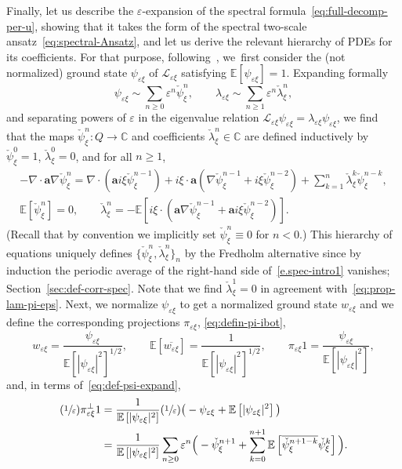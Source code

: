 \documentclass[JEP,XML,SOM,Unicode,published]{cedram}
\newcommand{\Psfrac}[2]{(\sfrac{#1}{#2})}
\theoremstyle{plain}
\theoremstyle{definition}
\numberwithin{equation}{section}
\newcommand{\e}{\varepsilon}
\newcommand{\Lc}{\mathcal{L}}
\newcommand{\C}{\mathbb C}
\newcommand{\Aa}{\boldsymbol a}
\newcommand{\expec}[1]{\mathbb{E}\left[ #1 \right]}
\begin{document}
Finally, let us describe the $\e$-expansion of the spectral formula~\eqref{eq:full-decomp-per-u}, showing that it takes {the} form of the spectral two-scale ansatz~\eqref{eq:spectral-Ansatz}, and let us derive the relevant hierarchy of PDEs for its coefficients. For that purpose, following~\cite{BG}, we~first consider the (not normalized) ground state $\psi_{\e\xi}$ of $\Lc_{\e\xi}$ satisfying $\expec{\psi_{\e\xi}}=1$.
Expanding {formally}
\begin{equation}\label{eq:def-psi-expand}
\psi_{\e\xi} \sim \sum_{n\ge0}\e^{n}\check\psi^n_\xi, \qquad \lambda_{\e\xi}\sim\sum_{n\ge1} \e^{n}\check\lambda^n_\xi,
\end{equation}
and separating powers of $\e$ in the eigenvalue relation $\Lc_{\e\xi}\psi_{\e\xi}=\lambda_{\e\xi}\psi_{\e\xi}$, we find that the maps $\check \psi^n_\xi:Q \to \C$ and coefficients $\check\lambda^n_\xi \in \C$ are defined inductively by $\check\psi^0_\xi=1$, $\check\lambda^0_\xi=0$, and for all $n\ge1$,
\begin{gather}\label{e.spec-intro1}
-\nabla\cdot\Aa\nabla\check\psi^{n}_\xi=\nabla\cdot(\Aa i\xi \check\psi^{n-1}_\xi)+i\xi\cdot \Aa(\nabla\check\psi^{n-1}_\xi+ i\xi\check\psi^{n-2}_\xi)+\sum_{k=1}^n\check \lambda^k_\xi\check\psi^{n-k}_\xi,\\
\expec{\check\psi^n_\xi}=0,\qquad \check \lambda^n_\xi=-\expec{i\xi\cdot(\Aa\nabla\check\psi^{n-1}_\xi+\Aa i\xi\check\psi^{n-2}_\xi)}.\nonumber
\end{gather}
(Recall that by convention we implicitly set $\check\psi_\xi^{n}\equiv0$ for $n<0$.)
This hierarchy of equations uniquely defines $\{\check\psi_\xi^n,\check\lambda_\xi^n\}_n$ by the Fredholm alternative since by induction the periodic average of the right-hand side of~\eqref{e.spec-intro1} vanishes; \cf Section~\ref{sec:def-corr-spec}. Note that we find $\check\lambda^1_\xi=0$ in agreement with~\eqref{eq:prop-lam-pi-eps}.
Next, we normalize $\psi_{\e\xi}$ to get a normalized ground state $w_{\e\xi}$ and we define the corresponding projections $\pi_{\e\xi}$, \cf \eqref{eq:defin-pi-ibot},
\begin{equation}\label{eq:link-w-psi}
w_{\e \xi}=\frac{\psi_{\e\xi}}{\expec{|\psi_{\e\xi}|^2}^{1/2}}, \qquad \expec{\overline{w_{\e \xi}}}=\frac1{\expec{|\psi_{\e\xi}|^2}^{1/2}},
\qquad\pi_{\e\xi}1=\frac{\psi_{\e\xi}}{\expec{|\psi_{\e\xi}|^2}},
\end{equation}
and, in terms of~\eqref{eq:def-psi-expand},
\begin{equation}\label{eq:expand-pibot1}
\begin{aligned}
\Psfrac1\e\pi^\bot_{\e\xi}1&=\frac{1}{\expec{|\psi_{\e\xi}|^2}}\Psfrac1\e\big(-\psi_{\e\xi}+\expec{|\psi_{\e\xi}|^2}\big)\\
&=\frac1{\expec{|\psi_{\e\xi}|^2}}\sum_{n\ge0}\e^n \Big(-\check\psi^{n+1}_\xi+\sum_{k=0}^{n+1}\expec{\overline{\check\psi^{n+1-k}_\xi}\check\psi^k_\xi}\Big).
\end{aligned}
\end{equation}
\end{document}
